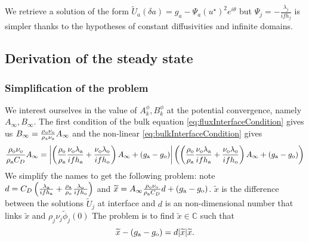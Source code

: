 \begin{remark}
We retrieve a solution of the form
$\widetilde{U}_a(\delta a) = g_a - \Psi_a (u^\star)^2 e^{i\theta}$
but $\Psi_j = -\frac{\lambda_j}{if h_j}$ is simpler thanks to the hypotheses of constant diffusivities and infinite domains.
\end{remark}

\subsection{Derivation of the steady state}
\subsubsection{Simplification of the problem}
We interest ourselves in the
value of $A_k^{\phi}, B_k^{\phi}$ at the potential convergence, namely $A_\infty, B_\infty$.
The first condition of the bulk equation \eqref{eq:fluxInterfaceCondition} gives us $B_\infty = \frac{\rho_{\rm o} \nu_{\rm o}}{\rho_{\rm a} \nu_{\rm a} } A_\infty$
and the non-linear \eqref{eq:bulkInterfaceCondition} gives
\begin{equation} \label{eq:stationaryBulkFirstEq}
    \frac{\rho_{\rm o} \nu_{\rm o}}{\rho_{\rm a} C_D} A_\infty
    =
    \left|
    \left(
    \frac{\rho_{\rm o}}{\rho_{\rm a}}\frac{\nu_{\rm o}\lambda_{\rm a}}{if h_{\rm a}} 
    +\frac{\nu_{\rm o}\lambda_{\rm o}}{if h_{\rm o}} \right) A_\infty
    + (g_{\rm a} - g_{\rm o})
    \right|
    \left(
    \left(
    \frac{\rho_{\rm o}}{\rho_{\rm a}}\frac{\nu_{\rm o}\lambda_{\rm a}}{if h_{\rm a}} 
    +\frac{\nu_{\rm o}\lambda_{\rm o}}{if h_{\rm o}} \right) A_\infty
    + (g_{\rm a} - g_{\rm o})
    \right)
\end{equation}
We simplify the names to get the following problem:
note $d = C_D \left(
    \frac{\lambda_{\rm a}}{if h_{\rm a}} 
    +\frac{\rho_{\rm a}}{\rho_{\rm o}}\frac{\lambda_{\rm o}}{if h_{\rm o}} \right)$ and
$\widetilde{x} = A_\infty \frac{\rho_{\rm o} \nu_{\rm o}}{\rho_{\rm a} C_D}d+\left(g_{\rm a} - g_{\rm o}\right)$.
$\widetilde{x}$ is the difference between the
solutions $\widetilde{U}_j$ at interface
and $d$ is an non-dimensional number that links
$\widetilde{x}$ and $\rho_j \nu_j \widetilde{\phi}_j(0)$
The problem is to find $\widetilde{x}\in \mathbb{C}$ such that
\begin{equation} \label{eq:mainEqSimplified}
    \widetilde{x} - \left(g_{\rm a} - g_{\rm o}\right) = d|\widetilde{x}|\widetilde{x}.
\end{equation}
